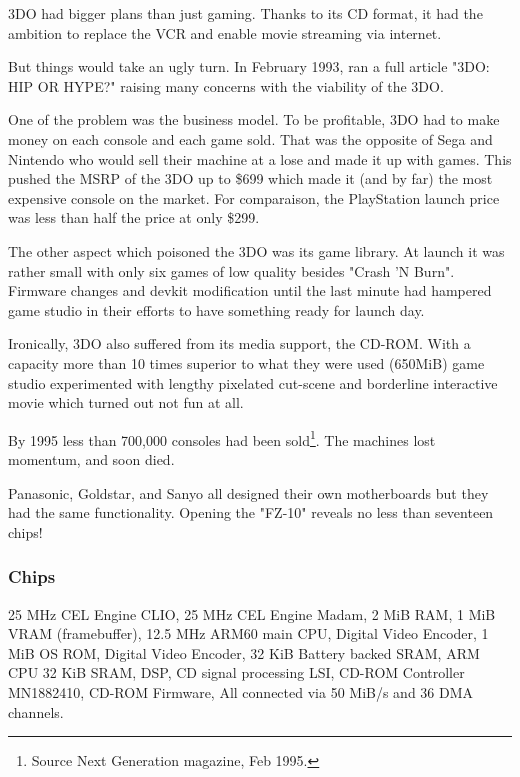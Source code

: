 \par
 3DO had bigger plans than just gaming. Thanks to its CD format, it had the ambition to replace the VCR and enable movie streaming via internet.\\
\par
But things would take an ugly turn. In February 1993,  ran a full article "3DO: HIP OR HYPE?" raising many concerns with the viability of the 3DO.\\
\par
One of the problem was the business model. To be profitable, 3DO had to make money on each console and each game sold. That was the opposite of Sega and Nintendo who would sell their machine at a lose and made it up with games. This pushed the MSRP of the 3DO up to \$699 which made it (and by far) the most expensive console on the market. For comparaison, the PlayStation launch price was less than half the price at only \$299.\\
\par
The other aspect which poisoned the 3DO was its game library. At launch it was rather small with only six games of low quality besides "Crash 'N Burn". Firmware changes and devkit modification until the last minute had hampered game studio in their efforts to have something ready for launch day.\\
\par
Ironically, 3DO also suffered from its media support, the CD-ROM. With a capacity more than 10 times superior to what they were used (650MiB) game studio experimented with lengthy pixelated cut-scene and borderline interactive movie which turned out not fun at all.\\
\par
By 1995 less than 700,000 consoles had been sold\footnote{Source Next Generation magazine, Feb 1995.}. The machines lost momentum, and soon died.


\par
Panasonic, Goldstar, and Sanyo all designed their own motherboards but they had the same functionality. Opening the  "FZ-10" reveals no less than seventeen chips!\\
\par
\subsubsection{Chips}
 25 MHz CEL Engine CLIO, 
 25 MHz CEL Engine  Madam, 
 2 MiB RAM, 
 1 MiB VRAM (framebuffer), 
 12.5 MHz ARM60 main CPU, 
 Digital Video Encoder, 
 1 MiB OS ROM, 
 Digital Video Encoder, 
 32 KiB Battery backed SRAM,  
 ARM CPU 32 KiB SRAM, 
 DSP, 
 CD signal processing LSI, 
 CD-ROM Controller MN1882410, 
 CD-ROM Firmware, All connected via 50 MiB/s and 36 DMA channels.
